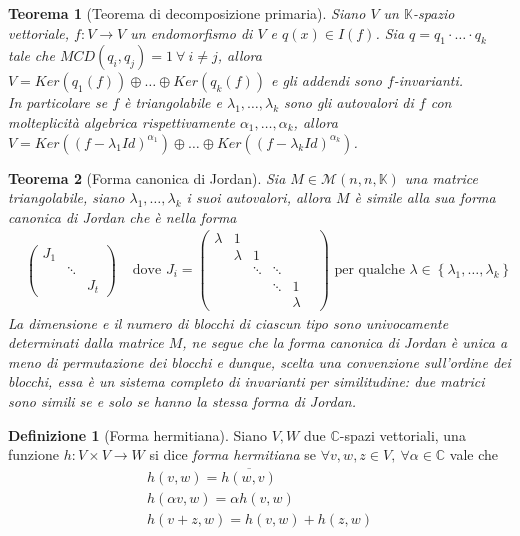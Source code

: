 \documentclass[11pt]{article}
\theoremstyle{plain}
\newtheorem{thm}{Teorema}[section]
\theoremstyle{definition}
\newtheorem{defn}{Definizione}[section]
\theoremstyle{remark}
\newcommand{\C}{\mathbb{C}}
\newcommand{\K}{\mathbb{K}}
\begin{document}
\begin{thm}[Teorema di decomposizione primaria]
\label{thm:dec_primaria}
	Siano $V$ un $\K$-spazio vettoriale, $f:V\to V$ un endomorfismo di $V$ e $q(x)\in I(f)$. Sia $q=q_1\cdot\ldots\cdot q_k$ tale che $MCD(q_i,q_j)=1\ \forall\ i\neq j$, allora $V=Ker(q_1(f))\oplus\dots\oplus Ker(q_k(f))$ e gli addendi sono $f$-invarianti.\\
	In particolare se $f$ è triangolabile e $\lambda_1,\ldots,\lambda_k$ sono gli autovalori di $f$ con molteplicità algebrica rispettivamente $\alpha_1,\ldots,\alpha_k$, allora $V=Ker\left((f-\lambda_1 Id)^{\alpha_1}\right)\oplus\dots\oplus Ker\left((f-\lambda_k Id)^{\alpha_k}\right)$.
\end{thm}

\begin{thm}[Forma canonica di Jordan]
	Sia $M\in \mathcal{M}(n,n,\K)$ una matrice triangolabile, siano $\lambda_1,\ldots,\lambda_k$ i suoi autovalori, allora $M$ è simile alla sua \textit{forma canonica di Jordan} che è nella forma
	\begin{align*}
		&\begin{pmatrix}
			J_1 & & \\
			& \ddots & \\
			& & J_t
		\end{pmatrix}		
		&\text{ dove }J_i=\begin{pmatrix}
		                  	\lambda & 1 & & & \\
							& \lambda & 1 & & \\
		                  	& & \ddots & \ddots & \\
		                  	& & & \ddots & 1 & \\
		                  	& & & & \lambda
		                  \end{pmatrix} \text{ per qualche }\lambda \in \left\{ \lambda_1,\ldots,\lambda_k \right\}
	\end{align*}
	La dimensione e il numero di blocchi di ciascun tipo sono univocamente determinati dalla matrice $M$, ne segue che la forma canonica di Jordan è unica a meno di permutazione dei blocchi e dunque, scelta una convenzione sull'ordine dei blocchi, essa è un sistema completo di invarianti per similitudine: due matrici sono simili se e solo se hanno la stessa forma di Jordan.

\end{thm}
\begin{defn}[Forma hermitiana]
Siano $V,W$ due $\C$-spazi vettoriali, una funzione $h:V\times V\to W$ si dice \textit{forma hermitiana} se $\forall v,w,z\in V,\ \forall \alpha \in \C$ vale che
\begin{gather*}
	h(v,w) = \overline{h(w,v)}\\
	h(\alpha v, w) = \alpha h(v,w)\\
	h(v+z,w)=h(v,w)+h(z,w)
\end{gather*}
\end{defn}
\end{document}
